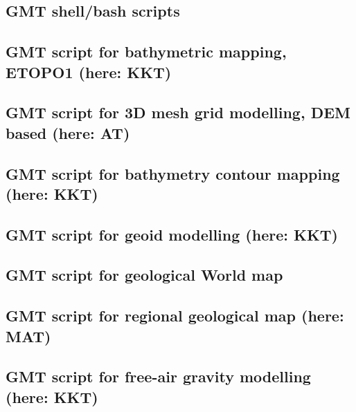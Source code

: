 \documentclass[11pt,a4paper]{report}
\begin{document}
{\begin{appendices}
\section{GMT shell/bash scripts}
\subsection{GMT script for bathymetric mapping, ETOPO1 (here: KKT)}\label{GMT:01}

\pagebreak

\subsection{GMT script for 3D mesh grid modelling, DEM based (here: AT)}\label{GMT:02}

\pagebreak

\subsection{GMT script for bathymetry contour mapping (here: KKT)}\label{GMT:03}

\pagebreak

\subsection{GMT script for geoid modelling (here: KKT)}\label{GMT:04}


\subsection{GMT script for geological World map}\label{GMT:05}

\pagebreak

\subsection{GMT script for regional geological map (here: MAT)}\label{GMT:06}

\pagebreak

\subsection{GMT script for free-air gravity modelling (here: KKT)}\label{GMT:07}

\pagebreak


\end{appendices}}
\end{document}
